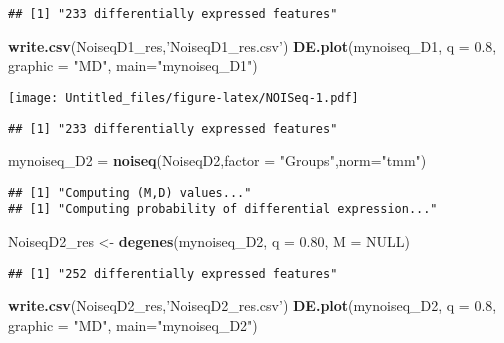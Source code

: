 \documentclass[]{article}
\newenvironment{Shaded}{\begin{snugshade}}{\end{snugshade}}
\newcommand{\DataTypeTok}[1]{\textcolor[rgb]{0.13,0.29,0.53}{#1}}
\newcommand{\FloatTok}[1]{\textcolor[rgb]{0.00,0.00,0.81}{#1}}
\newcommand{\KeywordTok}[1]{\textcolor[rgb]{0.13,0.29,0.53}{\textbf{#1}}}
\newcommand{\NormalTok}[1]{#1}
\newcommand{\OtherTok}[1]{\textcolor[rgb]{0.56,0.35,0.01}{#1}}
\newcommand{\StringTok}[1]{\textcolor[rgb]{0.31,0.60,0.02}{#1}}
\begin{document}
\begin{verbatim}
## [1] "233 differentially expressed features"
\end{verbatim}

\begin{Shaded}
\begin{Highlighting}[]
\KeywordTok{write.csv}\NormalTok{(NoiseqD1_res,}\StringTok{'NoiseqD1_res.csv'}\NormalTok{)}
\KeywordTok{DE.plot}\NormalTok{(mynoiseq_D1, }\DataTypeTok{q =} \FloatTok{0.8}\NormalTok{, }\DataTypeTok{graphic =} \StringTok{"MD"}\NormalTok{, }\DataTypeTok{main=}\StringTok{"mynoiseq_D1"}\NormalTok{)}
\end{Highlighting}
\end{Shaded}

\texttt{[image: Untitled\_files/figure-latex/NOISeq-1.pdf]}

\begin{verbatim}
## [1] "233 differentially expressed features"
\end{verbatim}

\begin{Shaded}
\begin{Highlighting}[]
\NormalTok{mynoiseq_D2 =}\StringTok{ }\KeywordTok{noiseq}\NormalTok{(NoiseqD2,}\DataTypeTok{factor =} \StringTok{"Groups"}\NormalTok{,}\DataTypeTok{norm=}\StringTok{"tmm"}\NormalTok{)}
\end{Highlighting}
\end{Shaded}

\begin{verbatim}
## [1] "Computing (M,D) values..."
## [1] "Computing probability of differential expression..."
\end{verbatim}

\begin{Shaded}
\begin{Highlighting}[]
\NormalTok{NoiseqD2_res <-}\StringTok{ }\KeywordTok{degenes}\NormalTok{(mynoiseq_D2, }\DataTypeTok{q =} \FloatTok{0.80}\NormalTok{, }\DataTypeTok{M =} \OtherTok{NULL}\NormalTok{)}
\end{Highlighting}
\end{Shaded}

\begin{verbatim}
## [1] "252 differentially expressed features"
\end{verbatim}

\begin{Shaded}
\begin{Highlighting}[]
\KeywordTok{write.csv}\NormalTok{(NoiseqD2_res,}\StringTok{'NoiseqD2_res.csv'}\NormalTok{)}
\KeywordTok{DE.plot}\NormalTok{(mynoiseq_D2, }\DataTypeTok{q =} \FloatTok{0.8}\NormalTok{, }\DataTypeTok{graphic =} \StringTok{"MD"}\NormalTok{, }\DataTypeTok{main=}\StringTok{"mynoiseq_D2"}\NormalTok{)}
\end{Highlighting}
\end{Shaded}
\end{document}
